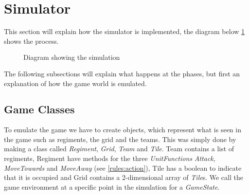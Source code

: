\section{Simulator}
	This section will explain how the simulator is implemented, the diagram below \ref{fig:sim} shows the process.
\begin{figure}[H]
\center
{}
\label{fig:sim}
\caption{Diagram showing the simulation}
\end{figure}

The following subsections will explain what happens at the phases, but first an explanation of how the game world is emulated.
\subsection{Game Classes}
	To emulate the game we have to create objects, which represent what is seen in the game such as regiments, the grid and the teams.
	This was simply done by making a class called {\it Regiment}, {\it Grid}, {\it Team} and {\it Tile}. 
	Team contains a list of regiments, Regiment have methods for the three {\it UnitFunctions} {\it Attack}, 
	{\it MoveTowards} and {\it MoveAway} (see \ref{rules:action}), Tile has a boolean to indicate that it is occupied 
	and Grid contains a 2-dimensional array of {\it Tile}s. We call the game environment at a specific point in the simulation for a {\it GameState}. 

